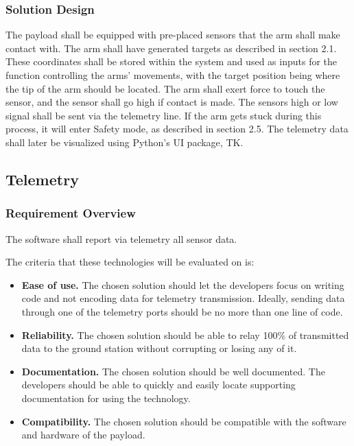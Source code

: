 \documentclass[letterpaper,10pt]{article}
\begin{document}
\subsubsection{Solution Design}
The payload shall be equipped with pre-placed sensors that the arm shall make contact with. The arm shall have generated targets
as described in section 2.1. These coordinates shall be stored within the system and used as inputs for the function controlling
the arms' movements, with the target position being where the tip of the arm should be located. The arm shall exert force to touch
the sensor, and the sensor shall go high if contact is made. The sensors high or low signal shall be sent via the telemetry
line. If the arm gets stuck during this process, it will enter Safety mode, as described in section 2.5. The telemetry data shall
later be visualized using Python's UI package, TK. 

\subsection{Telemetry}
\subsubsection{Requirement Overview}
The software shall report via telemetry all sensor data.

The criteria that these technologies will be evaluated on is:
\begin{itemize}
\item \textbf{Ease of use.}
The chosen solution should let the developers focus on writing code and not encoding data for telemetry transmission.
Ideally, sending data through one of the telemetry ports should be no more than one line of code. 
\item \textbf{Reliability.}
The chosen solution should be able to relay 100\% of transmitted data to the ground station without corrupting or losing any of it.
\item \textbf{Documentation.}
The chosen solution should be well documented.
The developers should be able to quickly and easily locate supporting documentation for using the technology.
\item \textbf{Compatibility.}
The chosen solution should be compatible with the software and hardware of the \gls{payload}.
\end{itemize}
\end{document}
